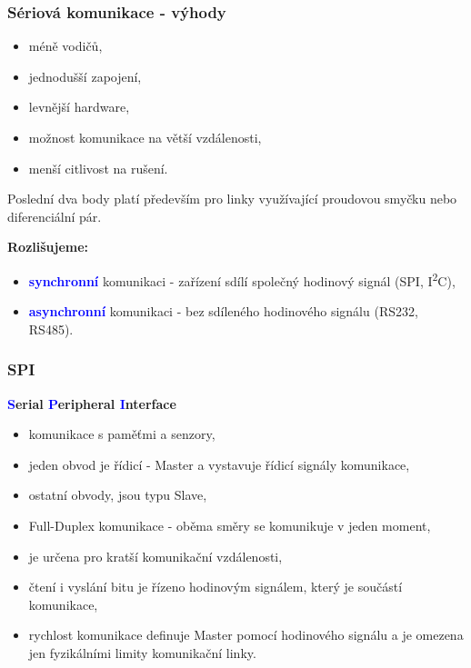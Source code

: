	\begin{frame}
    \frametitle{Sériová komunikace - výhody}
    
    \begin{itemize}
      \item méně vodičů,
      \item jednodušší zapojení,
      \item levnější hardware,
      \item možnost komunikace na větší vzdálenosti,
      \item menší citlivost na rušení.
    \end{itemize}
    
    Poslední dva body platí především pro linky využívající proudovou smyčku nebo diferenciální pár.
    
    \vspace{3mm}
    \textbf{Rozlišujeme:}
    
    \begin{itemize}
      \item \textcolor{blue}{\textbf{synchronní}} komunikaci - zařízení sdílí společný hodinový signál (SPI, I\textsuperscript{2}C),
      \item \textcolor{blue}{\textbf{asynchronní}} komunikaci - bez sdíleného hodinového signálu (RS232, RS485).
    \end{itemize}
	\end{frame}

	\begin{frame}
    \frametitle{SPI}
    
		\textbf{\textcolor{blue}{S}erial \textcolor{blue}{P}eripheral \textcolor{blue}{I}nterface}
    
    \begin{itemize}
      \item komunikace s paměťmi a senzory,
      \item jeden obvod je řídicí - Master a vystavuje řídicí signály komunikace,
      \item ostatní obvody, jsou typu Slave,
      \item Full-Duplex komunikace - oběma směry se komunikuje v jeden moment,
      \item je určena pro kratší komunikační vzdálenosti,
      \item čtení i vyslání bitu je řízeno hodinovým signálem, který je součástí komunikace,
      \item rychlost komunikace definuje Master pomocí hodinového signálu a je omezena jen fyzikálními limity komunikační linky.
    \end{itemize}

	\end{frame}
  
